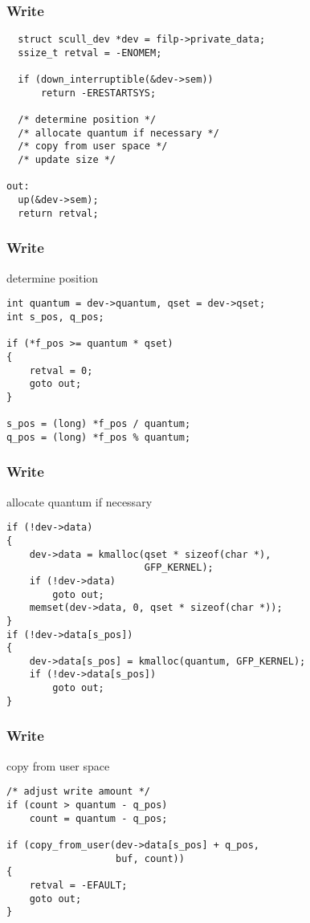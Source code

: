 \documentclass[dvipsnames]{beamer}
\begin{document}
\begin{frame}[fragile]
  \frametitle{Write}

  \begin{exampleblock}{}
    \begin{lstlisting}
  struct scull_dev *dev = filp->private_data;
  ssize_t retval = -ENOMEM;

  if (down_interruptible(&dev->sem))
      return -ERESTARTSYS;

  /* determine position */
  /* allocate quantum if necessary */
  /* copy from user space */
  /* update size */

out:
  up(&dev->sem);
  return retval;
    \end{lstlisting}
  \end{exampleblock}
\end{frame}

\begin{frame}[fragile]
  \frametitle{Write}

  \begin{exampleblock}{determine position}
    \begin{lstlisting}
int quantum = dev->quantum, qset = dev->qset;
int s_pos, q_pos;

if (*f_pos >= quantum * qset)
{
    retval = 0;
    goto out;
}

s_pos = (long) *f_pos / quantum;
q_pos = (long) *f_pos % quantum;
    \end{lstlisting}
  \end{exampleblock}
\end{frame}

\begin{frame}[fragile]
  \frametitle{Write}

  \begin{exampleblock}{allocate quantum if necessary}
    \begin{lstlisting}
if (!dev->data)
{
    dev->data = kmalloc(qset * sizeof(char *),
                        GFP_KERNEL);
    if (!dev->data)
        goto out;
    memset(dev->data, 0, qset * sizeof(char *));
}
if (!dev->data[s_pos])
{
    dev->data[s_pos] = kmalloc(quantum, GFP_KERNEL);
    if (!dev->data[s_pos])
        goto out;
}
    \end{lstlisting}
  \end{exampleblock}
\end{frame}

\begin{frame}[fragile]
  \frametitle{Write}

  \begin{exampleblock}{copy from user space}
    \begin{lstlisting}
/* adjust write amount */
if (count > quantum - q_pos)
    count = quantum - q_pos;

if (copy_from_user(dev->data[s_pos] + q_pos,
                   buf, count))
{
    retval = -EFAULT;
    goto out;
}
    \end{lstlisting}
  \end{exampleblock}
\end{frame}
\end{document}
